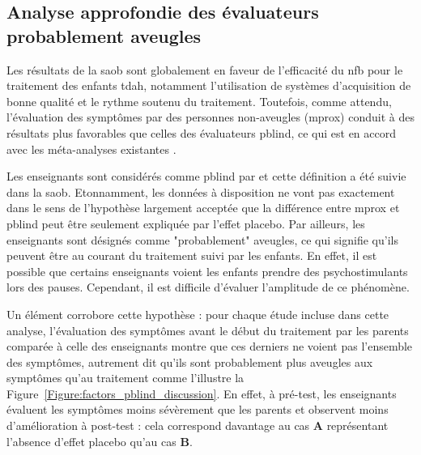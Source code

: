 \subsection{Analyse approfondie des évaluateurs probablement aveugles}

Les résultats de la \gls{saob} sont globalement en faveur de l'efficacité du \gls{nfb} pour le traitement des enfants \gls{tdah}, notamment l'utilisation 
de systèmes d'acquisition de bonne qualité et le rythme soutenu du traitement. Toutefois, comme attendu, l'évaluation
des symptômes par des personnes non-aveugles (\gls{mprox}) conduit à des résultats plus favorables que celles des évaluateurs \gls{pblind}, ce qui est en accord avec les
méta-analyses existantes \citep{Micoulaud2014, Cortese2016}. 

Les enseignants sont considérés comme \gls{pblind} par \citet{Cortese2016, Micoulaud2014} et cette définition a été suivie dans la \gls{saob}. Etonnamment, les données
à disposition ne vont pas exactement dans le sens de l'hypothèse largement acceptée que la différence entre \gls{mprox} et \gls{pblind} peut être seulement 
expliquée par l'effet placebo. Par ailleurs, les enseignants sont désignés comme "probablement" aveugles, ce qui signifie qu'ils peuvent être au courant du
traitement suivi par les enfants. En effet, il est possible que certains enseignants voient les enfants prendre des psychostimulants lors des pauses.
Cependant, il est difficile d'évaluer l'amplitude de ce phénomène. 

Un élément corrobore cette hypothèse : pour chaque étude incluse dans cette analyse, l'évaluation des symptômes avant le début
du traitement par les parents comparée à celle des enseignants montre que ces derniers ne voient pas l'ensemble des symptômes, autrement dit qu'ils sont probablement
plus aveugles aux symptômes qu'au traitement comme l'illustre la Figure~\ref{Figure:factors_pblind_discussion}. En effet, à pré-test, les enseignants évaluent les 
symptômes moins sévèrement que les parents et observent moins d'amélioration à post-test : cela correspond davantage au cas \textbf{A} représentant l'absence d'effet placebo
qu'au cas \textbf{B}.

